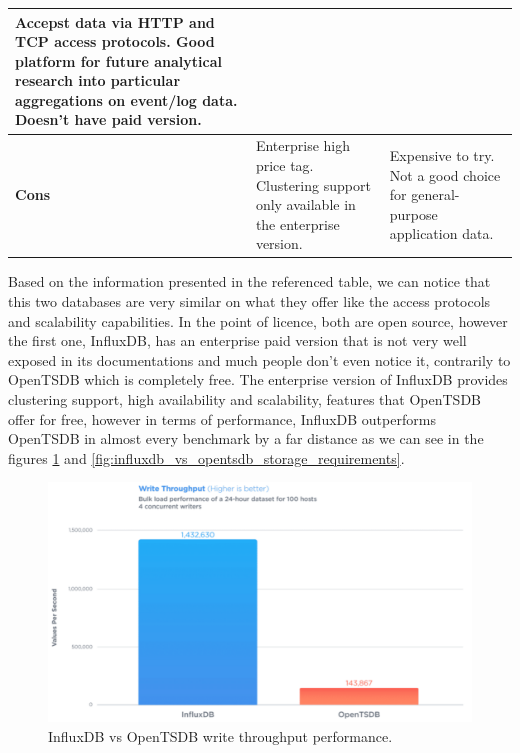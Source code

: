 \begin{table}[H]
\begin{tabularx}{\linewidth} {
    |>{\hsize=0.50\hsize}X| 
     >{\hsize=1.25\hsize}X|
     >{\hsize=1.25\hsize}X| }
    Accepst data via HTTP and TCP access protocols. \newline
    Good platform for future analytical research into particular aggregations on event/log data. \newline
    Doesn't have paid version. \\ \hline
    \textbf{Cons} 
    & Enterprise high price tag. \newline
    Clustering support only available in the enterprise version.
    & Expensive to try. \newline
    Not a good choice for general-purpose application data. \\ \hline
\end{tabularx}
\end{table}

Based on the information presented in the referenced table, we can notice that this two databases are very similar on what they offer like the access protocols and scalability capabilities. In the point of licence, both are open source, however the first one, InfluxDB, has an enterprise paid version that is not very well exposed in its documentations and much people don't even notice it, contrarily to OpenTSDB which is completely free. The enterprise version of InfluxDB provides clustering support, high availability and scalability\cite{influxdb_vs_opentsdb}, features that OpenTSDB offer for free, however in terms of performance, InfluxDB outperforms OpenTSDB in almost every benchmark by a far distance as we can see in the figures \ref{fig:influxdb_vs_opentsdb_write_throughput} and \ref{fig:influxdb_vs_opentsdb_storage_requirements}.

\begin{figure}[H]
    \centering
    \includegraphics[width=1.00\textwidth]{images/influxdb_vs_opentsdb_write_throughput.pdf}
    \caption{InfluxDB vs OpenTSDB write throughput performance\cite{influxdb_vs_opentsdb}.}
    \label{fig:influxdb_vs_opentsdb_write_throughput}
\end{figure}

